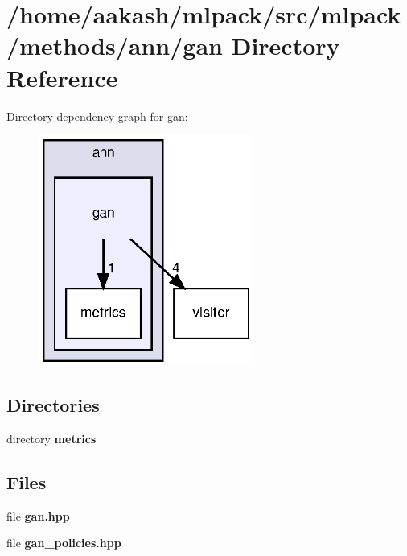 \section{/home/aakash/mlpack/src/mlpack/methods/ann/gan Directory Reference}
\label{dir_59bec0826d2e016f13c6682ecc8c9a58}
Directory dependency graph for gan\+:
\nopagebreak
\begin{figure}[H]
\begin{center}
\leavevmode
\includegraphics[width=200pt]{dir_59bec0826d2e016f13c6682ecc8c9a58_dep}
\end{center}
\end{figure}
\subsection*{Directories}
\begin{DoxyCompactItemize}
\item 
directory \textbf{ metrics}
\end{DoxyCompactItemize}
\subsection*{Files}
\begin{DoxyCompactItemize}
\item 
file \textbf{ gan.\+hpp}
\item 
file \textbf{ gan\+\_\+policies.\+hpp}
\end{DoxyCompactItemize}
